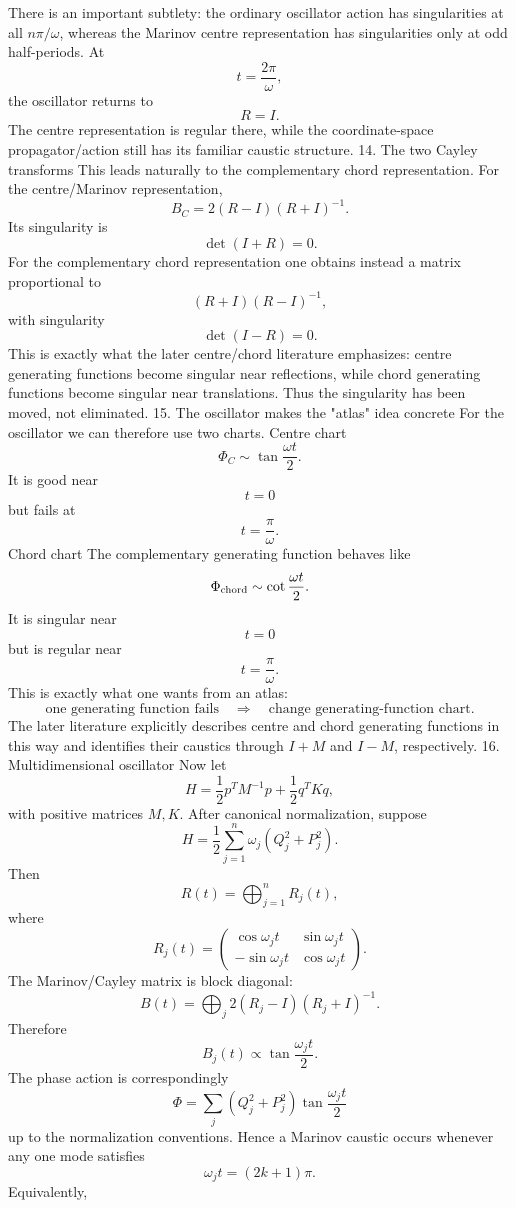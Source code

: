There is an important subtlety: the ordinary oscillator action has singularities at all \(n\pi/\omega\), whereas the Marinov centre representation has singularities only at odd half-periods.
At
$$ t=\frac{2\pi}{\omega}, $$
the oscillator returns to
$$ R=I. $$
The centre representation is regular there, while the coordinate-space propagator/action still has its familiar caustic structure.
14. The two Cayley transforms
This leads naturally to the complementary chord representation.
For the centre/Marinov representation,
$$ B_C = 2(R-I)(R+I)^{-1}. $$
Its singularity is
$$ \boxed{\det(I+R)=0.} $$
For the complementary chord representation one obtains instead a matrix proportional to
$$ (R+I)(R-I)^{-1}, $$
with singularity
$$ \boxed{\det(I-R)=0.} $$
This is exactly what the later centre/chord literature emphasizes: centre generating functions become singular near reflections, while chord generating functions become singular near translations.
Thus the singularity has been moved, not eliminated.
15. The oscillator makes the "atlas" idea concrete
For the oscillator we can therefore use two charts.
Centre chart
$$ \Phi_C \sim \tan\frac{\omega t}{2}. $$
It is good near
$$ t=0 $$
but fails at
$$ t=\frac{\pi}{\omega}. $$
Chord chart
The complementary generating function behaves like
$$ \Phi_{\rm chord} \sim \cot\frac{\omega t}{2}. $$
It is singular near
$$ t=0 $$
but is regular near
$$ t=\frac{\pi}{\omega}. $$
This is exactly what one wants from an atlas:
$$ \boxed{ \text{one generating function fails} \quad\Longrightarrow\quad \text{change generating-function chart}. } $$
The later literature explicitly describes centre and chord generating functions in this way and identifies their caustics through \(I+M\) and \(I-M\), respectively.
16. Multidimensional oscillator
Now let
$$ H= \frac12p^TM^{-1}p+ \frac12q^TKq, $$
with positive matrices \(M,K\).
After canonical normalization, suppose
$$ H= \frac12\sum_{j=1}^n \omega_j(Q_j^2+P_j^2). $$
Then
$$ R(t)= \bigoplus_{j=1}^n R_j(t), $$
where
$$ R_j(t)= \begin{pmatrix} \cos\omega_jt&\sin\omega_jt\\ -\sin\omega_jt&\cos\omega_jt \end{pmatrix}. $$
The Marinov/Cayley matrix is block diagonal:
$$ B(t)= \bigoplus_j 2(R_j-I)(R_j+I)^{-1}. $$
Therefore
$$ B_j(t)\propto \tan\frac{\omega_jt}{2}. $$
The phase action is correspondingly
$$ \Phi = \sum_j (Q_j^2+P_j^2) \tan\frac{\omega_jt}{2} $$
up to the normalization conventions.
Hence a Marinov caustic occurs whenever any one mode satisfies
$$ \omega_jt=(2k+1)\pi. $$
Equivalently,
